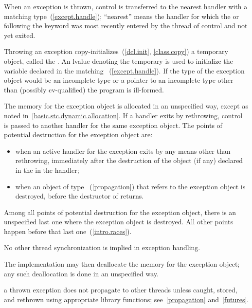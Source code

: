 \pnum
{}%
%
%
When an exception is thrown, control is transferred to the nearest handler with
a matching type~(\ref{except.handle}); ``nearest'' means the handler
for which the
 or
following the
keyword was most recently entered by the thread of control and not yet exited.

\pnum
Throwing an exception
copy-initializes~(\ref{dcl.init}, \ref{class.copy}) a temporary object,
called the
.
An lvalue denoting the temporary is used to initialize the
variable declared in the matching
~(\ref{except.handle}).
If the type of the exception object would
be an incomplete type or a pointer to an incomplete
type other than (possibly cv-qualified)
 the program is ill-formed.

\pnum
{}%
%
%
The memory for the exception object is
allocated in an unspecified way, except as noted in~\ref{basic.stc.dynamic.allocation}.
If a handler exits by rethrowing, control is passed to another handler for
the same exception object.
The points of potential destruction for the exception object are:

\begin{itemize}
\item
when an active handler for the exception exits by
any means other than
rethrowing,
immediately after the destruction of the object (if any)
declared in the  in the handler;

\item
when an object of type ~(\ref{propagation})
that refers to the exception object is destroyed,
before the destructor of  returns.
\end{itemize}

Among all points of potential destruction for the exception object,
there is an unspecified last one
where the exception object is destroyed.
All other points happen before that last one~(\ref{intro.races}).
\begin{note}
No other thread synchronization is implied in exception handling.
\end{note}
The implementation may then
deallocate the memory for the exception object; any such deallocation
is done in an unspecified way.
\begin{note} a thrown exception does not
propagate to other threads unless caught, stored, and rethrown using
appropriate library functions; see~\ref{propagation} and~\ref{futures}. \end{note}

